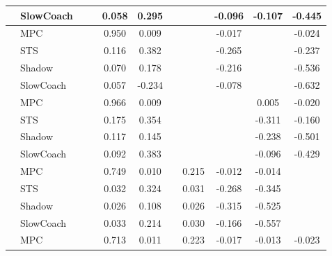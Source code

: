 \begin{tabular}{|l|l|*{9}{c|}}
                                                           & SlowCoach &       &        &     0.058 &  0.295 &     &     &  -0.096 &  -0.107 &   -0.445 \\
\midrule
[False, False, True, True, False, False, True, False, True] & MPC &       &        &     0.950 &  0.009 &     &     &  -0.017 &      &   -0.024 \\
                                                           & STS &       &        &     0.116 &  0.382 &     &     &  -0.265 &      &   -0.237 \\
                                                           & Shadow &       &        &     0.070 &  0.178 &     &     &  -0.216 &      &   -0.536 \\
                                                           & SlowCoach &       &        &     0.057 & -0.234 &     &     &  -0.078 &      &   -0.632 \\
\midrule
[False, False, True, True, False, False, False, True, True] & MPC &       &        &     0.966 &  0.009 &     &     &      &   0.005 &   -0.020 \\
                                                           & STS &       &        &     0.175 &  0.354 &     &     &      &  -0.311 &   -0.160 \\
                                                           & Shadow &       &        &     0.117 &  0.145 &     &     &      &  -0.238 &   -0.501 \\
                                                           & SlowCoach &       &        &     0.092 &  0.383 &     &     &      &  -0.096 &   -0.429 \\
\midrule
[False, False, True, True, False, True, True, True, False] & MPC &       &        &     0.749 &  0.010 &     &  0.215 &  -0.012 &  -0.014 &       \\
                                                           & STS &       &        &     0.032 &  0.324 &     &  0.031 &  -0.268 &  -0.345 &       \\
                                                           & Shadow &       &        &     0.026 &  0.108 &     &  0.026 &  -0.315 &  -0.525 &       \\
                                                           & SlowCoach &       &        &     0.033 &  0.214 &     &  0.030 &  -0.166 &  -0.557 &       \\
\midrule
[False, False, True, True, False, True, True, True, True] & MPC &       &        &     0.713 &  0.011 &     &  0.223 &  -0.017 &  -0.013 &   -0.023 \\

\end{tabular}
